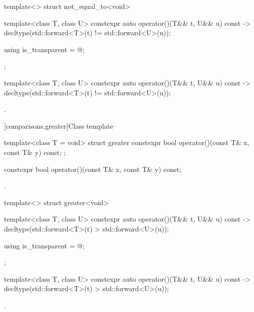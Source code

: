 %
\begin{itemdecl}
template<> struct not_equal_to<void> {
  template<class T, class U> constexpr auto operator()(T&& t, U&& u) const
    -> decltype(std::forward<T>(t) != std::forward<U>(u));

  using is_transparent = @\unspec@;
};
\end{itemdecl}

%
\begin{itemdecl}
template<class T, class U> constexpr auto operator()(T&& t, U&& u) const
  -> decltype(std::forward<T>(t) != std::forward<U>(u));
\end{itemdecl}

\begin{itemdescr}
\pnum
\returns
{}.
\end{itemdescr}

[comparisons.greater]{Class template }

%
\begin{itemdecl}
template<class T = void> struct greater {
  constexpr bool operator()(const T& x, const T& y) const;
};
\end{itemdecl}

%
\begin{itemdecl}
constexpr bool operator()(const T& x, const T& y) const;
\end{itemdecl}

\begin{itemdescr}
\pnum
\returns
{}.
\end{itemdescr}

%
\begin{itemdecl}
template<> struct greater<void> {
  template<class T, class U> constexpr auto operator()(T&& t, U&& u) const
    -> decltype(std::forward<T>(t) > std::forward<U>(u));

  using is_transparent = @\unspec@;
};
\end{itemdecl}

%
\begin{itemdecl}
template<class T, class U> constexpr auto operator()(T&& t, U&& u) const
  -> decltype(std::forward<T>(t) > std::forward<U>(u));
\end{itemdecl}

\begin{itemdescr}
\pnum
\returns
{}.
\end{itemdescr}

